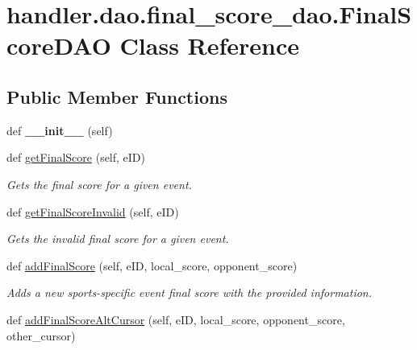 \hypertarget{classhandler_1_1dao_1_1final__score__dao_1_1_final_score_d_a_o}{}\section{handler.\+dao.\+final\+\_\+score\+\_\+dao.\+Final\+Score\+D\+AO Class Reference}
\label{classhandler_1_1dao_1_1final__score__dao_1_1_final_score_d_a_o}
\subsection*{Public Member Functions}
\begin{DoxyCompactItemize}
\item 
\mbox{\label{classhandler_1_1dao_1_1final__score__dao_1_1_final_score_d_a_o_a97dad29f4a4ee11022023a80376da101}} 
def {\bfseries \+\_\+\+\_\+init\+\_\+\+\_\+} (self)
\item 
def \hyperlink{classhandler_1_1dao_1_1final__score__dao_1_1_final_score_d_a_o_a8694f4c5772c0c15fd5d50a91a4103dd}{get\+Final\+Score} (self, e\+ID)
\begin{DoxyCompactList}\small\item\em Gets the final score for a given event. \end{DoxyCompactList}\item 
def \hyperlink{classhandler_1_1dao_1_1final__score__dao_1_1_final_score_d_a_o_a5236be2fb1a7a2d4a0ace18bf06f6fdd}{get\+Final\+Score\+Invalid} (self, e\+ID)
\begin{DoxyCompactList}\small\item\em Gets the invalid final score for a given event. \end{DoxyCompactList}\item 
def \hyperlink{classhandler_1_1dao_1_1final__score__dao_1_1_final_score_d_a_o_ad354d1c7e7a59dca95a856268d17881f}{add\+Final\+Score} (self, e\+ID, local\+\_\+score, opponent\+\_\+score)
\begin{DoxyCompactList}\small\item\em Adds a new sports-\/specific event final score with the provided information. \end{DoxyCompactList}\item 
def \hyperlink{classhandler_1_1dao_1_1final__score__dao_1_1_final_score_d_a_o_a3a0f69142e50d1193d01dad92e1e165f}{add\+Final\+Score\+Alt\+Cursor} (self, e\+ID, local\+\_\+score, opponent\+\_\+score, other\+\_\+cursor)

\end{DoxyCompactItemize}
